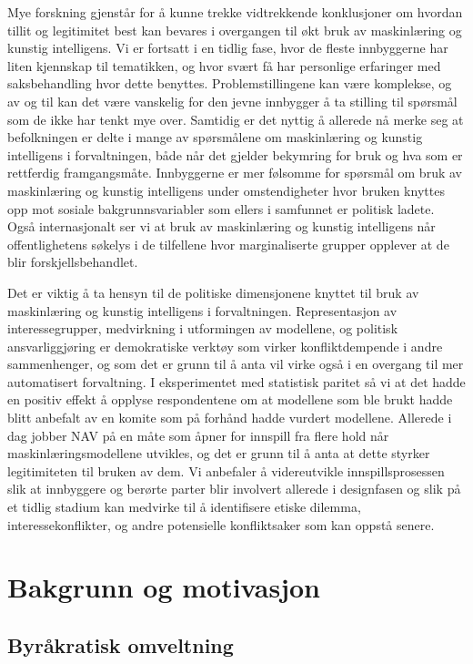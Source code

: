\documentclass[
]{book}
\begin{document}
Mye forskning gjenstår for å kunne trekke vidtrekkende konklusjoner om hvordan tillit og legitimitet best kan bevares i overgangen til økt bruk av maskinlæring og kunstig intelligens.
Vi er fortsatt i en tidlig fase, hvor de fleste innbyggerne har liten kjennskap til tematikken, og hvor svært få har personlige erfaringer med saksbehandling hvor dette benyttes.
Problemstillingene kan være komplekse, og av og til kan det være vanskelig for den jevne innbygger å ta stilling til spørsmål som de ikke har tenkt mye over.
Samtidig er det nyttig å allerede nå merke seg at befolkningen er delte i mange av spørsmålene om maskinlæring og kunstig intelligens i forvaltningen, både når det gjelder bekymring for bruk og hva som er rettferdig framgangsmåte.
Innbyggerne er mer følsomme for spørsmål om bruk av maskinlæring og kunstig intelligens under omstendigheter hvor bruken knyttes opp mot sosiale bakgrunnsvariabler som ellers i samfunnet er politisk ladete.
Også internasjonalt ser vi at bruk av maskinlæring og kunstig intelligens når offentlighetens søkelys i de tilfellene hvor marginaliserte grupper opplever at de blir forskjellsbehandlet.

Det er viktig å ta hensyn til de politiske dimensjonene knyttet til bruk av maskinlæring og kunstig intelligens i forvaltningen.
Representasjon av interessegrupper, medvirkning i utformingen av modellene, og politisk ansvarliggjøring er demokratiske verktøy som virker konfliktdempende i andre sammenhenger, og som det er grunn til å anta vil virke også i en overgang til mer automatisert forvaltning.
I eksperimentet med statistisk paritet så vi at det hadde en positiv effekt å opplyse respondentene om at modellene som ble brukt hadde blitt anbefalt av en komite som på forhånd hadde vurdert modellene.
Allerede i dag jobber NAV på en måte som åpner for innspill fra flere hold når maskinlæringsmodellene utvikles, og det er grunn til å anta at dette styrker legitimiteten til bruken av dem.
Vi anbefaler å videreutvikle innspillsprosessen slik at innbyggere og berørte parter blir involvert allerede i designfasen og slik på et tidlig stadium kan medvirke til å identifisere etiske dilemma, interessekonflikter, og andre potensielle konfliktsaker som kan oppstå senere.

\hypertarget{bakgrunn}{%
\chapter{Bakgrunn og motivasjon}\label{bakgrunn}}

\hypertarget{byruxe5kratisk-omveltning}{%
\section{Byråkratisk omveltning}\label{byruxe5kratisk-omveltning}}
\end{document}

